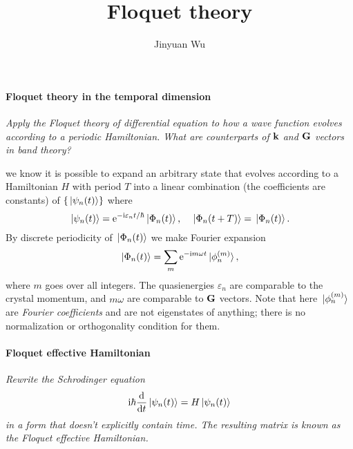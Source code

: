 \documentclass[hyperref, a4paper]{article}
\title{Floquet theory}
\author{Jinyuan Wu}
\newcommand*{\ii}{\mathrm{i}}
\newcommand*{\ee}{\mathrm{e}}
\begin{document}
\maketitle


\paragraph*{Floquet theory in the temporal dimension} 
\textit{
    Apply the Floquet theory of differential equation to 
    how a wave function evolves according to a periodic Hamiltonian.
    What are counterparts of $\vb{k}$ and $\vb{G}$ vectors in band theory?
}

we know it is possible to expand an arbitrary state that 
evolves according to a Hamiltonian $H$ with period $T$ into 
a linear combination (the coefficients are constants) of 
$\{\ket*{\psi_n(t)}\}$ where 
\begin{equation}
    \ket*{\psi_n (t)} = \ee^{- \ii \varepsilon_n t / \hbar} \ket*{\Phi_n(t)},
    \quad \ket*{\Phi_n(t + T)} = \ket*{\Phi_n(t)}.
    \label{eq:floquet-wave-function}
\end{equation}
By discrete periodicity of $\ket*{\Phi_n(t)}$ we make Fourier expansion 
\begin{equation}
    \ket*{\Phi_n(t)} = \sum_m \ee^{- \ii m \omega t} \ket*{\phi_n^{(m)}},
    \label{eq:big-phi-to-extended-hilbert}
\end{equation}
where $m$ goes over all integers.
The quasienergies $\varepsilon_n$ are comparable to the crystal momentum,
and $m \omega$ are comparable to $\vb{G}$ vectors.
Note that here $\ket*{\phi_n^{(m)}}$
are \emph{Fourier coefficients} and are not eigenstates of anything; 
there is no normalization or orthogonality condition for them.

\paragraph*{Floquet effective Hamiltonian} 
\textit{
    Rewrite the Schrodinger equation 
    \begin{equation}
        \ii \hbar \dv{t} \ket*{\psi_n(t)} = H \ket*{\psi_n(t)}
    \end{equation}
    in a form that doesn't explicitly contain time. 
    The resulting matrix is known as the Floquet effective Hamiltonian.
}
\end{document}
